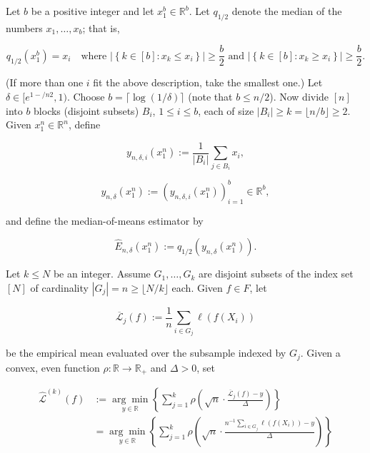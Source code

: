 \begin{definition}

Let \(b\) be a positive integer and let \(x_1^b \in \mathbb{R}^b\). Let \(q_{1/2}\) denote the median of the numbers \(x_1, \ldots, x_b\); that is,

\[
q_{1/2}\left(x_1^b\right) = x_i \quad \text{where } \left| \left\{k \in [b]: x_k \leq x_i \right\}\right| \geq \frac{b}{2} \text{ and }  \left| \left\{k \in [b]: x_k \geq x_i \right\}\right| \geq \frac{b}{2} .
\]

(If more than one \(i\) fit the above description, take the smallest one.) Let \(\delta \in [e^{1-/n2}, 1)\). Choose \(b = \lceil \log (1/\delta) \rceil\) (note that \(b \leq n/2\)). Now divide \([n]\) into \(b\) blocks (disjoint subsets) \(B_i\), \(1 \leq i \leq b\), each of size \(|B_i| \geq k = \lfloor n/b \rfloor \geq 2\). Given \(x_1^n \in \mathbb{R}^n\), define

\[
y_{n, \delta, i}\left(x_1^n \right) := \frac{1}{|B_i|} \sum_{j \in B_i} x_i,
\]

\[
y_{n, \delta}\left(x_1^n \right) := \left( y_{n, \delta, i} \left(x_1^n \right)\right)_{i=1}^b \in \mathbb{R}^b,
\]

and define the median-of-means estimator by 

\[
\hat{E}_{n, \delta}\left(x_1^n \right) := q_{1/2} \left(y_{n, \delta} \left(x_1^n \right) \right).
\]

\end{definition}

\begin{definition}

Let \(k \leq N\) be an integer. Assume \(G_1, \ldots, G_k\) are disjoint subsets of the index set \([N]\) of cardinality \(|G_j| = n \geq \lfloor N/k \rfloor\) each. Given \(f \in F\), let

\[
\overline{\mathcal{L}}_j(f) := \frac{1}{n} \sum_{i \in G_j} \ell(f(X_i))
\]

be the empirical mean evaluated over the subsample indexed by \(G_j\). Given a convex, even function \(\rho: \mathbb{R} \to \mathbb{R}_+\) and \(\Delta > 0\), set

\begin{align*}
\hat{\mathcal{L}}^{(k)} (f)  & := \underset{y \in \mathbb{R}}{\arg \min} \left\{ \sum_{j=1}^k \rho\left( \sqrt{n} \cdot \frac{\overline{\mathcal{L}}_j(f)  -y}{\Delta} \right)\right\}
\\ & = \underset{y \in \mathbb{R}}{\arg \min} \left\{ \sum_{j=1}^k \rho\left( \sqrt{n} \cdot\frac{n^{-1} \sum_{i \in G_j} \ell(f(X_i)) -y}{\Delta} \right)\right\}
\end{align*}



\end{definition}

